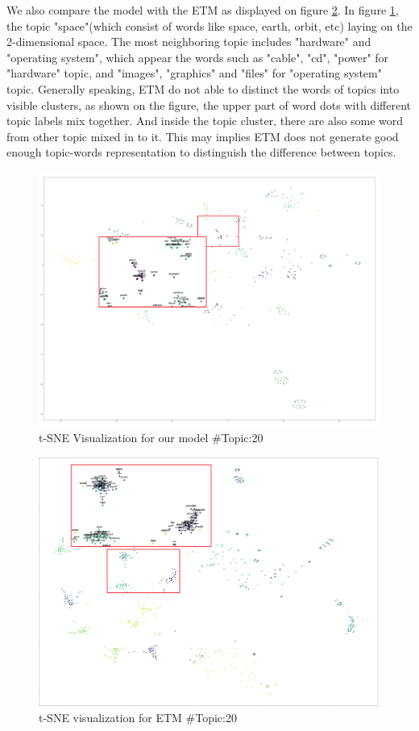 We also compare the model with the ETM as displayed on figure \ref{fig:tsne20t50w1_etm}. In figure \ref{fig:tsne20t25w2}, the topic "space"(which consist of words like space, earth, orbit, etc) laying on the 2-dimensional space. The most neighboring topic includes "hardware" and "operating system", which appear the words such as "cable", "cd", "power" for "hardware" topic, and "images", "graphics" and "files" for "operating system" topic. Generally speaking, ETM do not able to distinct the words of topics into visible clusters, as shown on the figure, the upper part of word dots with different topic labels mix together. And inside the topic cluster, there are also some word from other topic mixed in to it. This may implies ETM does not generate good enough topic-words representation to distinguish the difference between topics.
\begin{figure}
\centering
\includegraphics[width=1\linewidth]{figures/0908/tsne_20t_25w_2.png}
\caption{t-SNE Visualization for our model \#Topic:20}
\label{fig:tsne20t25w2}
\end{figure}
\begin{figure}
\centering
\includegraphics[width=1\linewidth]{figures/0106/tsne_20t_50w_2.png}
\caption{t-SNE visualization for ETM \#Topic:20}
\label{fig:tsne20t50w1_etm}
\end{figure}
